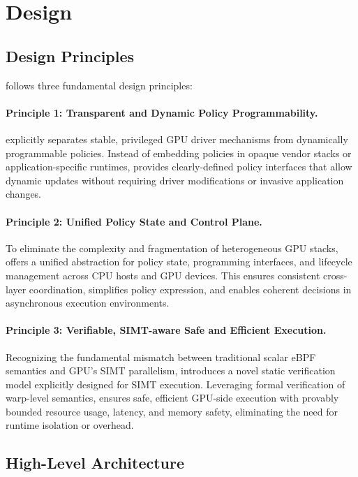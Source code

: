 \section{\sys Design}

\subsection{Design Principles}

\sys follows three fundamental design principles:

\paragraph{Principle 1: Transparent and Dynamic Policy Programmability.}
\sys explicitly separates stable, privileged GPU driver mechanisms from dynamically programmable policies. Instead of embedding policies in opaque vendor stacks or application-specific runtimes, \sys provides clearly-defined policy interfaces that allow dynamic updates without requiring driver modifications or invasive application changes.

\paragraph{Principle 2: Unified Policy State and Control Plane.}
To eliminate the complexity and fragmentation of heterogeneous GPU stacks, \sys offers a unified abstraction for policy state, programming interfaces, and lifecycle management across CPU hosts and GPU devices. This ensures consistent cross-layer coordination, simplifies policy expression, and enables coherent decisions in asynchronous execution environments.

\paragraph{Principle 3: Verifiable, SIMT-aware Safe and Efficient Execution.}
Recognizing the fundamental mismatch between traditional scalar eBPF semantics and GPU's SIMT parallelism, \sys introduces a novel static verification model explicitly designed for SIMT execution. Leveraging formal verification of warp-level semantics, \sys ensures safe, efficient GPU-side execution with provably bounded resource usage, latency, and memory safety, eliminating the need for runtime isolation or overhead.

\subsection{High-Level Architecture}
\label{sec:arch}

